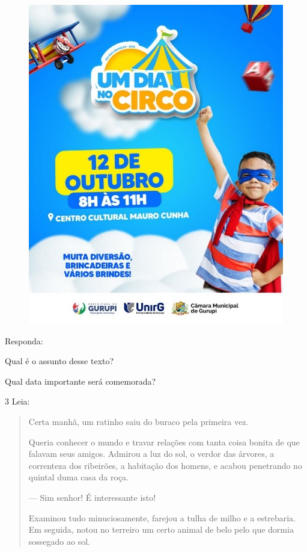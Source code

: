 \begin{figure}[htpb!]
\centering
\includegraphics[width=.8\textwidth]{media/image119.jpeg}
\end{figure}


Responda:

\begin{escolha}
\item Qual é o assunto desse texto?


\item Qual data importante será comemorada?

\end{escolha}

\num{3} Leia:


\begin{quote}
Certa manhã, um ratinho saiu do buraco pela primeira vez.

Queria conhecer o mundo e travar relações com tanta coisa bonita de que
falavam seus amigos. Admirou a luz do sol, o verdor das árvores, a
correnteza dos ribeirões, a habitação dos homens, e acabou penetrando no
quintal duma casa da roça.

--- Sim senhor! É interessante isto!

Examinou tudo minuciosamente, farejou a tulha de milho e a estrebaria.
Em seguida, notou no terreiro um certo animal de belo pelo que dormia
sossegado ao sol.

\end{quote}

